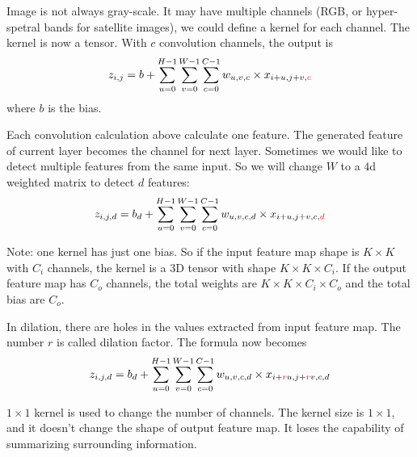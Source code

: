 \begin{example}
    Image is not always gray-scale. It may have multiple channels (RGB, or hyper-spetral bands for satellite images), we could define a kernel for each channel. The kernel is now a tensor. With $c$ convolution channels, the output is
\begin{equation}
    z_{i,j} = b + \sum_{u=0}^{H-1} \sum_{v=0}^{W-1} \sum_{c=0}^{C-1} w_{u,v,c} \times x_{i+u,j+v,{\color{red}c}}
\end{equation}
    where $b$ is the bias.
\end{example}


\begin{example}
    Each convolution calculation above calculate one feature. The generated feature of current layer becomes the channel for next layer. Sometimes we would like to detect multiple features from the same input. So we will change $W$ to a $4$d weighted matrix to detect $d$ features:
    \begin{equation}
        z_{i,j,d} = b_d + \sum_{u=0}^{H-1} \sum_{v=0}^{W-1} \sum_{c=0}^{C-1} w_{u,v,c,d} \times x_{i+u,j+v,c,{\color{red}d}}
    \end{equation}
    
    Note: one kernel has just one bias. So if the input feature map shape is $K \times K$ with $C_i$ channels, the kernel is a 3D tensor with shape $K \times K \times C_i$. If the output feature map has $C_o$ channels, the total weights are $K \times K \times C_i \times C_o$ and the total bias are $C_o$.
\end{example}

\begin{example}
    In dilation, there are holes in the values extracted from input feature map. The number $r$ is called dilation factor. The formula now becomes
    \begin{equation}
        z_{i,j,d} = b_d + \sum_{u=0}^{H-1} \sum_{v=0}^{W-1} \sum_{c=0}^{C-1} w_{u,v,c,d} \times x_{i+{\color{red}r}u,j+{\color{red}r}v,c,d}
    \end{equation}
\end{example}


\begin{example}
    $1 \times 1$ kernel is used to change the number of channels. The kernel size is $1 \times 1$, and it doesn't change the shape of output feature map. It loses the capability of summarizing surrounding information.
\end{example}







